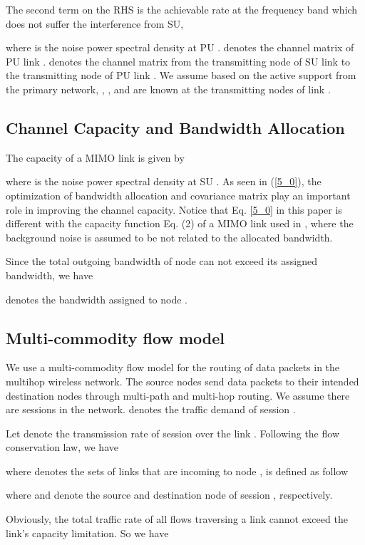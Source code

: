 \documentclass[12pt,onecolumn,tworows]{IEEEtran}
\begin{document}
The second term on the RHS  is the achievable rate at the frequency band which does not suffer the interference from SU,

where  is the noise power spectral density at PU .
 denotes the channel matrix of PU link  .
 denotes the channel matrix from the transmitting node of SU link  to the transmitting node of PU link .
We assume based on the active support from the primary network, , ,  and  are known at the transmitting nodes of link .



\subsection{Channel Capacity and Bandwidth Allocation}
The capacity of a MIMO link  is given by

where  is the noise power spectral density at SU .
As seen in (\ref{5_0}), the optimization of bandwidth allocation  and covariance matrix  play an important role in improving the channel capacity.
Notice that Eq. \eqref{5_0}  in this paper is different with the capacity function Eq. (2) of a MIMO link used in \cite{LiuJSAC2008},
where the background noise is assumed to be not related to the allocated bandwidth.

Since the total outgoing bandwidth of node  can not exceed its assigned bandwidth, we have

 denotes the bandwidth assigned to node .






 \subsection{Multi-commodity flow model}

 We use a multi-commodity flow model for the routing of data packets in the multihop wireless network. The source nodes send data packets to their intended destination nodes through multi-path and multi-hop routing. We assume there are  sessions in the network.  denotes the traffic demand of session .

 Let  denote the transmission rate of session   over the link . Following the flow conservation law, we have
 
where  denotes the sets of links that are incoming to node ,  is defined as follow


where  and  denote the source and destination node of session , respectively.

Obviously, the total traffic rate of all flows traversing a link cannot exceed the
link's capacity limitation. So we have
\end{document}
